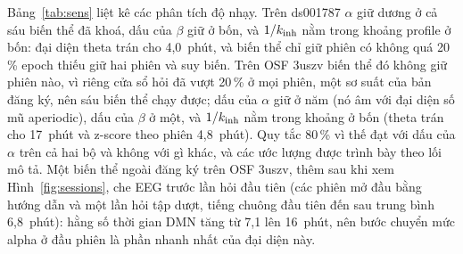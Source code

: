 Bảng~\ref{tab:sens} liệt kê các phân tích độ nhạy. Trên ds001787 $\alpha$ giữ dương ở cả sáu biến thể đã khoá, dấu của $\beta$ giữ ở bốn, và $1/k_{\mathrm{inh}}$ nằm trong khoảng profile ở bốn: đại diện theta trán cho 4,0~phút, và biến thể chỉ giữ phiên có không quá 20\,\% epoch thiếu giữ hai phiên và suy biến. Trên OSF 3uszv biến thể đó không giữ phiên nào, vì riêng cửa sổ hỏi đã vượt 20\,\% ở mọi phiên, một sơ suất của bản đăng ký, nên sáu biến thể chạy được; dấu của $\alpha$ giữ ở năm (nó âm với đại diện số mũ aperiodic), dấu của $\beta$ ở một, và $1/k_{\mathrm{inh}}$ nằm trong khoảng ở bốn (theta trán cho 17~phút và z-score theo phiên 4,8~phút). Quy tắc 80\,\% vì thế đạt với dấu của $\alpha$ trên cả hai bộ và không với gì khác, và các ước lượng được trình bày theo lối mô tả. Một biến thể ngoài đăng ký trên OSF 3uszv, thêm sau khi xem Hình~\ref{fig:sessions}, che EEG trước lần hỏi đầu tiên (các phiên mở đầu bằng hướng dẫn và một lần hỏi tập dượt, tiếng chuông đầu tiên đến sau trung bình 6,8~phút): hằng số thời gian DMN tăng từ 7,1 lên 16~phút, nên bước chuyển mức alpha ở đầu phiên là phần nhanh nhất của đại diện này.

